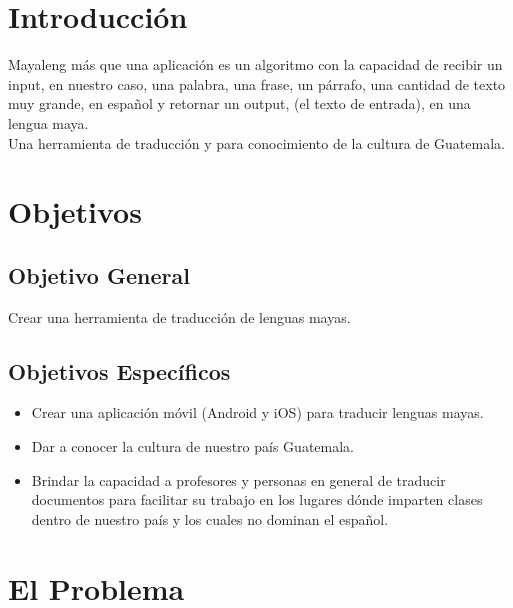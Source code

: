 \documentclass[a4paper,openright,11pt]{article}
\begin{document}
\tableofcontents

\cleardoublepage
\listoffigures

\cleardoublepage
\listoftables

\newpage

\pagestyle{fancy}
\section{Introducci\'on}
Mayaleng m\'as que una aplicaci\'on es un algoritmo con la capacidad de recibir un input, en nuestro caso, una palabra, una frase, un p\'arrafo, una cantidad de texto muy grande, en espa\~nol y retornar un output, (el texto de entrada), en una lengua maya. \\

Una herramienta de traducci\'on y para conocimiento de la cultura de Guatemala.
\newpage

\section{Objetivos}
\subsection{Objetivo General}
Crear una herramienta de traducci\'on de lenguas mayas.
\subsection{Objetivos Espec\'ificos}
\begin{itemize}
    \item Crear una aplicaci\'on m\'ovil (Android y iOS) para traducir lenguas mayas.
    \item Dar a conocer la cultura de nuestro pa\'is Guatemala.
    \item Brindar la capacidad a profesores y personas en general de traducir documentos para facilitar su trabajo en los lugares d\'onde imparten clases dentro de nuestro pa\'is y los cuales no dominan el espa\~nol.
\end{itemize}
\newpage

\section{El Problema}
\end{document}
